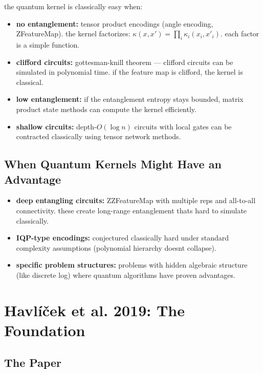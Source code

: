 \documentclass[11pt,a4paper]{article}
\theoremstyle{definition}
\theoremstyle{remark}
\begin{document}
the quantum kernel is classically easy when:
\begin{itemize}
    \item \textbf{no entanglement:} tensor product encodings (angle encoding, ZFeatureMap). the kernel factorizes: $\kappa(x,x') = \prod_i \kappa_i(x_i, x'_i)$. each factor is a simple function.
    \item \textbf{clifford circuits:} gottesman-knill theorem --- clifford circuits can be simulated in polynomial time. if the feature map is clifford, the kernel is classical.
    \item \textbf{low entanglement:} if the entanglement entropy stays bounded, matrix product state methods can compute the kernel efficiently.
    \item \textbf{shallow circuits:} depth-$O(\log n)$ circuits with local gates can be contracted classically using tensor network methods.
\end{itemize}

\subsection{When Quantum Kernels Might Have an Advantage}

\begin{itemize}
    \item \textbf{deep entangling circuits:} ZZFeatureMap with multiple reps and all-to-all connectivity. these create long-range entanglement thats hard to simulate classically.
    \item \textbf{IQP-type encodings:} conjectured classically hard under standard complexity assumptions (polynomial hierarchy doesnt collapse).
    \item \textbf{specific problem structures:} problems with hidden algebraic structure (like discrete log) where quantum algorithms have proven advantages.
\end{itemize}

\section{Havl\'i\v{c}ek et al. 2019: The Foundation}

\subsection{The Paper}
\end{document}
